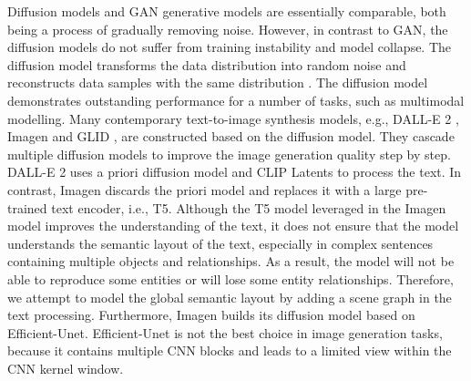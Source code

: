 \documentclass{article}
\begin{document}
Diffusion models and GAN generative models are essentially comparable, both being a process of gradually removing noise. However, in contrast to GAN, the diffusion models do not suffer from training instability and model collapse. The diffusion model transforms the data distribution into random noise and reconstructs data samples with the same distribution \cite{Saharia2022PhotorealisticTD,Cao2022ASO}. The diffusion model demonstrates outstanding performance for a number of tasks, such as multimodal modelling. Many contemporary text-to-image synthesis models, e.g., DALL-E 2 \cite{Ramesh2022HierarchicalTI}, Imagen \cite{Saharia2022PhotorealisticTD} and GLID \cite{Nichol2022GLIDETP}, are constructed based on the diffusion model. They cascade multiple diffusion models to improve the image generation quality step by step. DALL-E 2 uses a priori diffusion model and CLIP Latents to process the text. In contrast, Imagen discards the priori model and replaces it with a large pre-trained text encoder, i.e., T5. Although the T5 model leveraged in the Imagen model improves the understanding of the text, it does not ensure that the model understands the semantic layout of the text, especially in complex sentences containing multiple objects and relationships. As a result, the model will not be able to reproduce some entities or will lose some entity relationships. Therefore, we attempt to model the global semantic layout by adding a scene graph in the text processing. Furthermore, Imagen builds its diffusion model based on Efficient-Unet. Efficient-Unet is not the best choice in image generation tasks, because it contains multiple CNN blocks and leads to a limited view within the CNN kernel window. 
\end{document}
